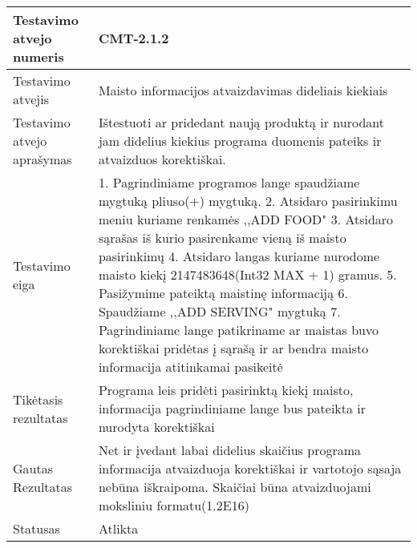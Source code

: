 \documentclass[oneside]{VUMIFPSkursinis}
\begin{document}
\begin{center}
    \begin{tabular}{ |p{5cm}|p{13cm}|}
    \hline
    	Testavimo atvejo numeris & CMT-2.1.2  \\ \hline
    	Testavimo atvejis & Maisto informacijos atvaizdavimas dideliais kiekiais  \\ \hline
	Testavimo atvejo aprašymas & Ištestuoti ar pridedant naują produktą ir nurodant jam didelius kiekius programa duomenis pateiks ir atvaizduos korektiškai.  \\ \hline
	Testavimo eiga & 1. Pagrindiniame programos lange spaudžiame mygtuką pliuso(+) mygtuką. 
				2. Atsidaro pasirinkimu meniu kuriame renkamės ,,ADD FOOD"
				3. Atsidaro sąrašas iš kurio pasirenkame vieną iš maisto pasirinkimų
				4. Atsidaro langas kuriame nurodome maisto kiekį 2147483648(Int32 MAX + 1) gramus.
				5. Pasižymime pateiktą maistinę informaciją
				6. Spaudžiame ,,ADD SERVING"  mygtuką
				7. Pagrindiniame lange patikriname ar maistas buvo korektiškai pridėtas į sąrašą ir ar bendra maisto informacija atitinkamai pasikeitė\\ \hline
	Tikėtasis rezultatas & Programa leis pridėti pasirinktą kiekį maisto, informacija pagrindiniame lange bus pateikta ir nurodyta korektiškai  \\ \hline
	Gautas Rezultatas & Net ir įvedant labai didelius skaičius programa informacija atvaizduoja korektiškai ir vartotojo sąsaja nebūna iškraipoma. Skaičiai būna atvaizduojami moksliniu formatu(1.2E16) \\ \hline
	Statusas & Atlikta  \\ \hline
    \hline
    \end{tabular}
\end{center}
\end{document}
